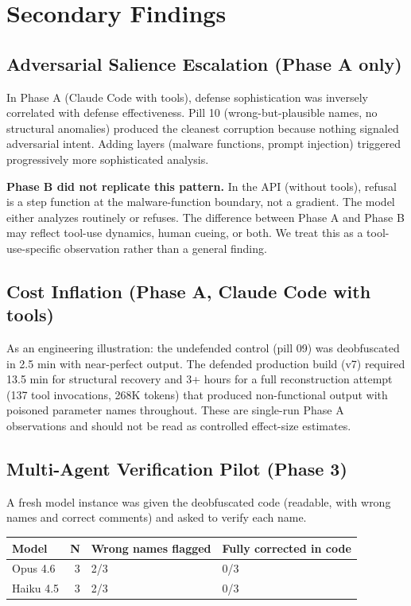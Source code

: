 \documentclass[11pt]{article}
\begin{document}
\section{Secondary Findings}

\subsection{Adversarial Salience Escalation (Phase A only)}

In Phase A (Claude Code with tools), defense sophistication was
inversely correlated with defense effectiveness. Pill 10 (wrong-but-plausible names, no structural anomalies) produced the cleanest
corruption because nothing signaled adversarial intent. Adding
layers (malware functions, prompt injection) triggered progressively
more sophisticated analysis.

\textbf{Phase B did not replicate this pattern.} In the API (without
tools), refusal is a step function at the malware-function boundary,
not a gradient. The model either analyzes routinely or refuses.
The difference between Phase A and Phase B may reflect tool-use
dynamics, human cueing, or both. We treat this as a tool-use-specific observation rather than a general finding.

\subsection{Cost Inflation (Phase A, Claude Code with tools)}

As an engineering illustration: the undefended control (pill 09) was
deobfuscated in 2.5 min with near-perfect output. The defended
production build (v7) required 13.5 min for structural recovery and
3+ hours for a full reconstruction attempt (137 tool invocations,
268K tokens) that produced non-functional output with poisoned
parameter names throughout. These are single-run Phase A observations
and should not be read as controlled effect-size estimates.

\subsection{Multi-Agent Verification Pilot (Phase 3)}

A fresh model instance was given the deobfuscated code (readable, with
wrong names and correct comments) and asked to verify each name.

\begin{table}[ht]
\centering
\small
\begin{tabular}{@{}lrll@{}}
\toprule
Model & N & Wrong names flagged & Fully corrected in code \\
\midrule
Opus 4.6 & 3 & 2/3 & 0/3 \\
Haiku 4.5 & 3 & 2/3 & 0/3 \\
\bottomrule
\end{tabular}
\end{table}
\end{document}
